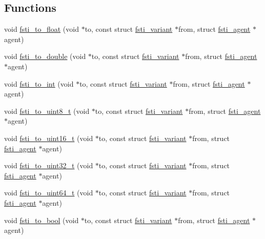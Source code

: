\subsection*{Functions}
\begin{DoxyCompactItemize}
\item 
void \mbox{\hyperlink{fsti-events_8h_af4a768af0f5d827f7b40da95c29879da}{fsti\+\_\+to\+\_\+float}} (void $\ast$to, const struct \mbox{\hyperlink{structfsti__variant}{fsti\+\_\+variant}} $\ast$from, struct \mbox{\hyperlink{structfsti__agent}{fsti\+\_\+agent}} $\ast$agent)
\item 
void \mbox{\hyperlink{fsti-events_8h_a89b0fd0e286b354aa15c5e5bbfc50bcb}{fsti\+\_\+to\+\_\+double}} (void $\ast$to, const struct \mbox{\hyperlink{structfsti__variant}{fsti\+\_\+variant}} $\ast$from, struct \mbox{\hyperlink{structfsti__agent}{fsti\+\_\+agent}} $\ast$agent)
\item 
void \mbox{\hyperlink{fsti-events_8h_ae5bb2a1c874126eca3ed12115e22360a}{fsti\+\_\+to\+\_\+int}} (void $\ast$to, const struct \mbox{\hyperlink{structfsti__variant}{fsti\+\_\+variant}} $\ast$from, struct \mbox{\hyperlink{structfsti__agent}{fsti\+\_\+agent}} $\ast$agent)
\item 
void \mbox{\hyperlink{fsti-events_8h_ae35be4fced1f9a93476a536b20332478}{fsti\+\_\+to\+\_\+uint8\+\_\+t}} (void $\ast$to, const struct \mbox{\hyperlink{structfsti__variant}{fsti\+\_\+variant}} $\ast$from, struct \mbox{\hyperlink{structfsti__agent}{fsti\+\_\+agent}} $\ast$agent)
\item 
void \mbox{\hyperlink{fsti-events_8h_ae8b4ae93bd4e79aa79a65582fd20b612}{fsti\+\_\+to\+\_\+uint16\+\_\+t}} (void $\ast$to, const struct \mbox{\hyperlink{structfsti__variant}{fsti\+\_\+variant}} $\ast$from, struct \mbox{\hyperlink{structfsti__agent}{fsti\+\_\+agent}} $\ast$agent)
\item 
void \mbox{\hyperlink{fsti-events_8h_aeb78cf09418931e6fb729435a33a9b7f}{fsti\+\_\+to\+\_\+uint32\+\_\+t}} (void $\ast$to, const struct \mbox{\hyperlink{structfsti__variant}{fsti\+\_\+variant}} $\ast$from, struct \mbox{\hyperlink{structfsti__agent}{fsti\+\_\+agent}} $\ast$agent)
\item 
void \mbox{\hyperlink{fsti-events_8h_a964cff2ca16ac067e90708b2f04f7098}{fsti\+\_\+to\+\_\+uint64\+\_\+t}} (void $\ast$to, const struct \mbox{\hyperlink{structfsti__variant}{fsti\+\_\+variant}} $\ast$from, struct \mbox{\hyperlink{structfsti__agent}{fsti\+\_\+agent}} $\ast$agent)
\item 
void \mbox{\hyperlink{fsti-events_8h_a4e7751c7aa6ac604615cc3829150d828}{fsti\+\_\+to\+\_\+bool}} (void $\ast$to, const struct \mbox{\hyperlink{structfsti__variant}{fsti\+\_\+variant}} $\ast$from, struct \mbox{\hyperlink{structfsti__agent}{fsti\+\_\+agent}} $\ast$agent)

\end{DoxyCompactItemize}
